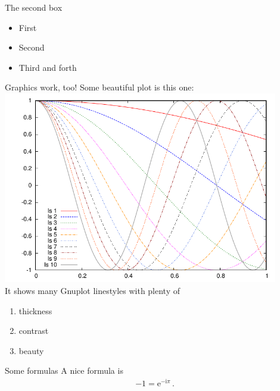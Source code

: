 \begin{greenbox}{The second box}
\begin{itemize}
	\item First
	\item Second
	\item Third and forth
\end{itemize}
\end{greenbox}

\begin{greenbox}{Graphics work, too!}
Some beautiful plot is this one:\\ %
\includegraphics[width=0.9\textwidth]{images/colortest}\\
It shows many Gnuplot linestyles with plenty of
\begin{enumerate}
	\item thickness
	\item contrast
	\item beauty
\end{enumerate}

\end{greenbox}

\columnbreak

\begin{greenbox}{Some formulas}
A nice formula is\\
\begin{align*}
-1 = \mathrm{e}^{-\mathrm{i}\pi}\, .
\end{align*}
\end{greenbox}

